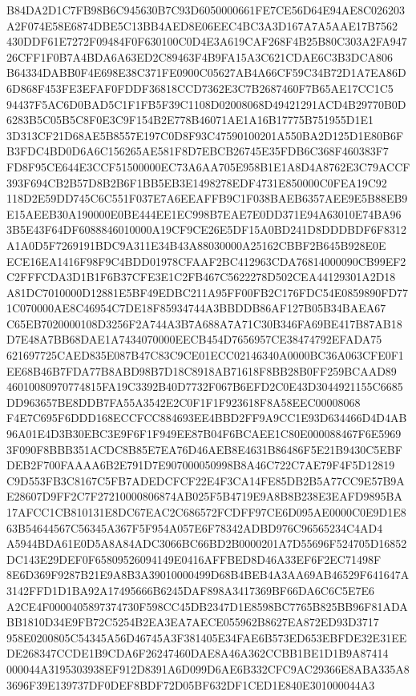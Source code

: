 \documentclass[UTF8,fontset=fandol,zihao=-4,a4paper]{ctexart}
\begin{document}
{{B84DA2D1C7FB98B6C945630B7C93D6050000661FE7CE56D64E94AE8C026203A2F074E58E6874DBE5C13BB4AED8E06EEC4BC3A3D167A7A5AAE17B7562
430DDF61E7272F09484F0F630100C0D4E3A619CAF268F4B25B80C303A2FA94726CFF1F0B7A4BDA6A63ED2C89463F4B9FA15A3C621CDAE6C3B3DCA806
B64334DABB0F4E698E38C371FE0900C05627AB4A66CF59C34B72D1A7EA86D6D868F453FE3EFAF0FDDF36818CCD7362E3C7B2687460F7B65AE17CC1C5
94437F5AC6D0BAD5C1F1FB5F39C1108D02008068D49421291ACD4B29770B0D6283B5C05B5C8F0E3C9F154B2E778B46071AE1A16B17775B751955D1E1
3D313CF21D68AE5B8557E197C0D8F93C47590100201A550BA2D125D1E80B6FB3FDC4BD0D6A6C156265AE581F8D7EBCB26745E35FDB6C368F460383F7
FD8F95CE644E3CCF51500000EC73A6AA705E958B1E1A8D4A8762E3C79ACCF393F694CB2B57D8B2B6F1BB5EB3E1498278EDF4731E850000C0FEA19C92
118D2E59DD745C6C551F037E7A6EEAFFB9C1F038BAEB6357AEE9E5B88EB9E15AEEB30A190000E0BE444EE1EC998B7EAE7E0DD371E94A63010E74BA96
3B5E43F64DF6088846010000A19CF9CE26E5DF15A0BD241D8DDDBDF6F8312A1A0D5F7269191BDC9A311E34B43A88030000A25162CBBF2B645B928E0E
ECE16EA1416F98F9C4BDD01978CFAAF2BC412963CDA76814000090CB99EF2C2FFFCDA3D1B1F6B37CFE3E1C2FB467C5622278D502CEA44129301A2D18
A81DC7010000D12881E5BF49EDBC211A95FF00FB2C176FDC54E0859890FD771C070000AE8C46954C7DE18F85934744A3BBDDB86AF127B05B34BAEA67
C65EB7020000108D3256F2A744A3B7A688A7A71C30B346FA69BE417B87AB18D7E48A7BB68DAE1A7434070000EECB454D7656957CE38474792EFADA75
621697725CAED835E087B47C83C9CE01ECC02146340A0000BC36A063CFE0F1EE68B46B7FDA77B8ABD98B7D18C8918AB71618F8BB28B0FF259BCAAD89
46010080970774815FA19C3392B40D7732F067B6EFD2C0E43D3044921155C6685DD963657BE8DDB7FA55A3542E2C0F1F1F923618F8A58EEC00008068
F4E7C695F6DDD168ECCFCC884693EE4BBD2FF9A9CC1E93D634466D4D4AB96A01E4D3B30EBC3E9F6F1F949EE87B04F6BCAEE1C80E000088467F6E5969
3F090F8BBB351ACDC8B85E7EA76D46AEB8E4631B86486F5E21B9430C5EBFDEB2F700FAAAA6B2E791D7E907000050998B8A46C722C7AE79F4F5D12819
C9D553FB3C8167C5FB7ADEDCFCF22E4F3CA14FE85DB2B5A77CC9E57B9AE28607D9FF2C7F27210000806874AB025F5B4719E9A8B8B238E3EAFD9895BA
17AFCC1CB810131E8DC67EAC2C686572FCDFF97CE6D095AE0000C0E9D1E863B54644567C56345A367F5F954A057E6F78342ADBD976C96565234C4AD4
A5944BDA61E0D5A8A84ADC3066BC66BD2B0000201A7D55696F524705D16852DC143E29DEF0F65809526094149E0416AFFBED8D46A33EF6F2EC71498F
8E6D369F9287B21E9A8B3A39010000499D68B4BEB4A3AA69AB46529F641647A3142FFD1D1BA92A17495666B6245DAF898A3417369BF66DA6C6C5E7E6
A2CE4F0000405897374730F598CC45DB2347D1E8598BC7765B825BB96F81ADABB1810D34E9FB72C5254B2EA3EA7AECE055962B8627EA872ED93D3717
958E0200805C54345A56D46745A3F381405E34FAE6B573ED653EBFDE32E31EEDE268347CCDE1B9CDA6F26247460DAE8A46A362CCBB1BE1D1B9A87414
000044A3195303938EF912D8391A6D099D6AE6B332CFC9AC29366E8ABA335A83696F39E139737DF0DEF8BDF72D05BF632DF1CED1E840E301000044A3
}}
\end{document}
